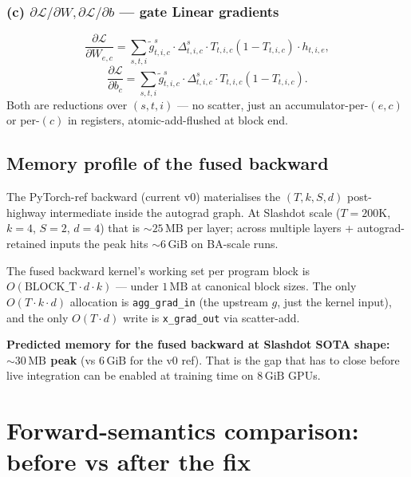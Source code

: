 \documentclass[11pt,a4paper]{article}
\begin{document}
\subsubsection{(c) $\partial \mathcal{L} / \partial W, \partial \mathcal{L} / \partial b$ — gate Linear gradients}

\[
\frac{\partial \mathcal{L}}{\partial W_{e, c}}
= \sum_{s, t, i} \tilde g^{s}_{t,i,c} \cdot \Delta^{s}_{t,i,c} \cdot T_{t,i,c}(1 - T_{t,i,c}) \cdot h_{t,i,e},
\]
\[
\frac{\partial \mathcal{L}}{\partial b_{c}}
= \sum_{s, t, i} \tilde g^{s}_{t,i,c} \cdot \Delta^{s}_{t,i,c} \cdot T_{t,i,c}(1 - T_{t,i,c}).
\]
Both are reductions over $(s, t, i)$ --- no scatter, just an accumulator-per-$(e,c)$ or per-$(c)$ in registers, atomic-add-flushed at block end.

\subsection{Memory profile of the fused backward}

The PyTorch-ref backward (current v0) materialises the $(T, k, S, d)$ post-highway intermediate inside the autograd graph. At Slashdot scale ($T=200\text{K}$, $k=4$, $S=2$, $d=4$) that is $\sim 25\,\text{MB}$ per layer; across multiple layers + autograd-retained inputs the peak hits $\sim 6\,\text{GiB}$ on BA-scale runs.

The fused backward kernel's working set per program block is $O(\mathrm{BLOCK\_T} \cdot d \cdot k)$ --- under $1\,\text{MB}$ at canonical block sizes. The only $O(T \cdot k \cdot d)$ allocation is \texttt{agg\_grad\_in} (the upstream $g$, just the kernel input), and the only $O(T \cdot d)$ write is \texttt{x\_grad\_out} via scatter-add.

\textbf{Predicted memory for the fused backward at Slashdot SOTA shape: $\sim 30\,\text{MB}$ peak} (vs $6\,\text{GiB}$ for the v0 ref). That is the gap that has to close before live integration can be enabled at training time on $8\,\text{GiB}$ GPUs.

\section{Forward-semantics comparison: before vs after the fix}
\end{document}
